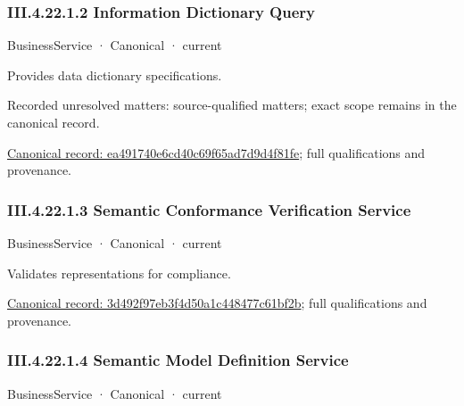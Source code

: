 \subsubsection*{III.4.22.1.2 Information Dictionary Query}
\label{navigation:III.4.22.1.2}

\label{element:ea491740e6cd40c69f65ad7d9d4f81fe}
{\small BusinessService · Canonical · current}\par

Provides data dictionary specifications.


{\small Recorded unresolved matters: source-qualified matters; exact scope remains in the canonical record.}\par
{\footnotesize \href{../../../../continuum/business/business-service/ea491740e6cd40c69f65ad7d9d4f81fe.md}{Canonical record: ea491740e6cd40c69f65ad7d9d4f81fe}; full qualifications and provenance.}\par
\subsubsection*{III.4.22.1.3 Semantic Conformance Verification Service}
\label{navigation:III.4.22.1.3}

\label{element:3d492f97eb3f4d50a1c448477c61bf2b}
{\small BusinessService · Canonical · current}\par

Validates representations for compliance.


{\footnotesize \href{../../../../continuum/business/business-service/3d492f97eb3f4d50a1c448477c61bf2b.md}{Canonical record: 3d492f97eb3f4d50a1c448477c61bf2b}; full qualifications and provenance.}\par
\subsubsection*{III.4.22.1.4 Semantic Model Definition Service}
\label{navigation:III.4.22.1.4}

\label{element:0f6b41152f294a87b84970c74ab5a014}
{\small BusinessService · Canonical · current}\par

